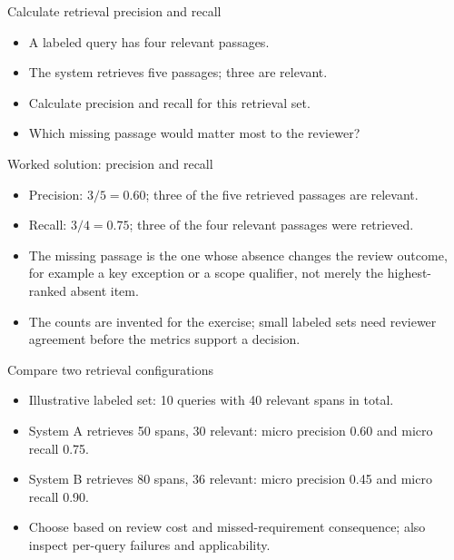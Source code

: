 \documentclass[aspectratio=169,11pt]{beamer}
\begin{document}
\begin{frame}[t,fragile]{Calculate retrieval precision and recall}
\fontsize{11.5}{14}\selectfont
\begin{itemize}\setlength{\itemsep}{2mm}
\item A labeled query has four relevant passages.
\item The system retrieves five passages; three are relevant.
\item Calculate precision and recall for this retrieval set.
\item Which missing passage would matter most to the reviewer?
\end{itemize}
\end{frame}
\begin{frame}[t,fragile]{Worked solution: precision and recall}
\fontsize{11.5}{14}\selectfont
\begin{itemize}\setlength{\itemsep}{2mm}
\item Precision: $3/5 = 0.60$; three of the five retrieved passages are relevant.
\item Recall: $3/4 = 0.75$; three of the four relevant passages were retrieved.
\item The missing passage is the one whose absence changes the review outcome, for example a key exception or a scope qualifier, not merely the highest-ranked absent item.
\item The counts are invented for the exercise; small labeled sets need reviewer agreement before the metrics support a decision.
\end{itemize}
\end{frame}
\begin{frame}[t,fragile]{Compare two retrieval configurations}
\fontsize{11.5}{14}\selectfont
\begin{itemize}\setlength{\itemsep}{2mm}
\item Illustrative labeled set: 10 queries with 40 relevant spans in total.
\item System A retrieves 50 spans, 30 relevant: micro precision 0.60 and micro recall 0.75.
\item System B retrieves 80 spans, 36 relevant: micro precision 0.45 and micro recall 0.90.
\item Choose based on review cost and missed-requirement consequence; also inspect per-query failures and applicability.
\end{itemize}
\end{frame}
\end{document}
